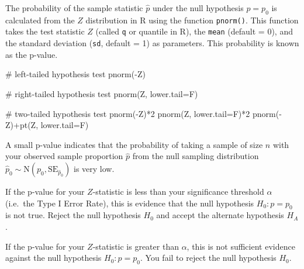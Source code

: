 \documentclass[
  letterpaper,
  DIV=11,
  numbers=noendperiod]{scrartcl}
\newenvironment{Shaded}{\begin{snugshade}}{\end{snugshade}}
\newcommand{\AttributeTok}[1]{\textcolor[rgb]{0.40,0.45,0.13}{#1}}
\newcommand{\CommentTok}[1]{\textcolor[rgb]{0.37,0.37,0.37}{#1}}
\newcommand{\DecValTok}[1]{\textcolor[rgb]{0.68,0.00,0.00}{#1}}
\newcommand{\FunctionTok}[1]{\textcolor[rgb]{0.28,0.35,0.67}{#1}}
\newcommand{\NormalTok}[1]{\textcolor[rgb]{0.00,0.23,0.31}{#1}}
\newcommand{\SpecialCharTok}[1]{\textcolor[rgb]{0.37,0.37,0.37}{#1}}
\begin{document}
The probability of the sample statistic \(\hat{p}\) under the null
hypothesis \(p=p_0\) is calculated from the \(Z\) distribution in R
using the function \texttt{pnorm()}. This function takes the test
statistic \(Z\) (called \texttt{q} or quantile in R), the \texttt{mean}
(default = 0), and the standard deviation (\texttt{sd}, default = 1) as
parameters. This probability is known as the p-value.

\begin{Shaded}
\begin{Highlighting}[]
\CommentTok{\# left{-}tailed hypothesis test}
\FunctionTok{pnorm}\NormalTok{(}\SpecialCharTok{{-}}\NormalTok{Z)}

\CommentTok{\# right{-}tailed hypothesis test}
\FunctionTok{pnorm}\NormalTok{(Z, }\AttributeTok{lower.tail=}\NormalTok{F)}

\CommentTok{\# two{-}tailed hypothesis test}
\FunctionTok{pnorm}\NormalTok{(}\SpecialCharTok{{-}}\NormalTok{Z)}\SpecialCharTok{*}\DecValTok{2}
\FunctionTok{pnorm}\NormalTok{(Z, }\AttributeTok{lower.tail=}\NormalTok{F)}\SpecialCharTok{*}\DecValTok{2}
\FunctionTok{pnorm}\NormalTok{(}\SpecialCharTok{{-}}\NormalTok{Z)}\SpecialCharTok{+}\FunctionTok{pt}\NormalTok{(Z, }\AttributeTok{lower.tail=}\NormalTok{F)}
\end{Highlighting}
\end{Shaded}

A small p-value indicates that the probability of taking a sample of
size \(n\) with your observed sample proportion \(\hat{p}\) from the
null sampling distribution
\(\hat{p}_0 \sim \text{N}\left(p_0, \text{SE}_{\hat{p}_0}\right)\) is
very low.

If the p-value for your \(Z\)-statistic is less than your significance
threshold \(\alpha\) (i.e.~the Type I Error Rate), this is evidence that
the null hypothesis \(H_0 \colon p=p_0\) is not true. Reject the null
hypothesis \(H_0\) and accept the alternate hypothesis \(H_A\).

If the p-value for your \(Z\)-statistic is greater than \(\alpha\), this
is not sufficient evidence against the null hypothesis
\(H_0 \colon p=p_0\). You fail to reject the null hypothesis \(H_0\).
\end{document}
